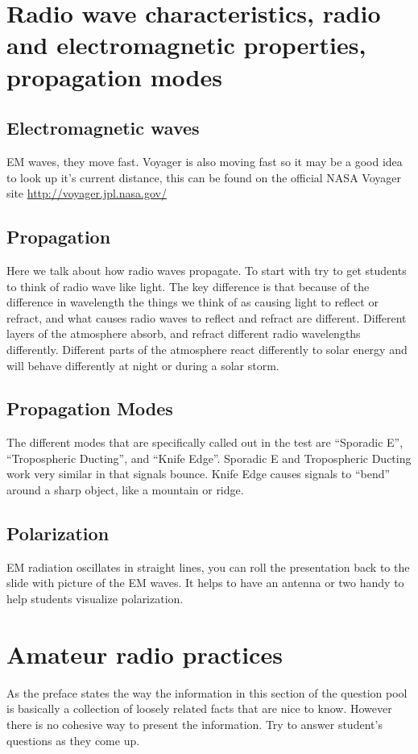 \documentclass[12pt,letterpaper]{report}
\begin{document}
\section*{Radio wave characteristics, radio and electromagnetic properties, propagation modes}

\subsection*{Electromagnetic waves}
EM waves, they move fast. Voyager is also moving fast so it may be a good idea to look up it's current distance, this can be found on the official NASA Voyager site \url{http://voyager.jpl.nasa.gov/}

\subsection*{Propagation}
Here we talk about how radio waves propagate. To start with try to get students to think of radio wave like light. The key difference is that because of the difference in wavelength the things we think of as causing light to reflect or refract, and what causes radio waves to reflect and refract are different. Different layers of the atmosphere absorb, and refract different radio wavelengths differently. Different parts of the atmosphere react differently to solar energy and will behave differently at night or during a solar storm. 

\subsection*{Propagation Modes}
The different modes that are specifically called out in the test are ``Sporadic E'', ``Tropospheric Ducting'', and ``Knife Edge''. Sporadic E and Tropospheric Ducting work very similar in that signals bounce. Knife Edge causes signals to ``bend'' around a sharp object, like a mountain or ridge.

\subsection*{Polarization}
EM radiation oscillates in straight lines, you can roll the presentation back to the slide with picture of the EM waves. It helps to have an antenna or two handy to help students visualize polarization. 

\section*{Amateur radio practices}
As the preface states the way the information in this section of the question pool is basically a collection of loosely related facts that are nice to know. However there is no cohesive way to present the information. Try to answer student's questions as they come up.
\end{document}

